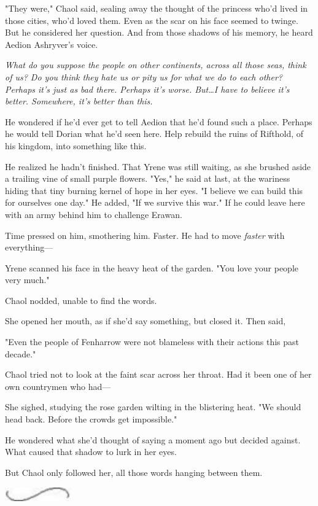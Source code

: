 "They were," Chaol said, sealing away the thought of the princess who'd lived in those cities, who'd loved them.
Even as the scar on his face seemed to twinge.
But he considered her question.
And from those shadows of his memory, he heard Aedion Ashryver's voice.

\emph{What do you suppose the people on other continents, across all those seas, think of us?
Do you think they hate us or pity us for what we do to each other?
Perhaps it's just as bad there.
Perhaps it's worse.
But\ldots I have to believe it's better.
Somewhere, it's better than this.}

He wondered if he'd ever get to tell Aedion that he'd found such a place.
Perhaps he would tell Dorian what he'd seen here.
Help rebuild the ruins of Rifthold, of his kingdom, into something like this.

He realized he hadn't finished.
That Yrene was still waiting, as she brushed aside a trailing vine of small purple flowers.
"Yes," he said at last, at the wariness hiding that tiny burning kernel of hope in her eyes.
"I believe we can build this for ourselves one day."
He added, "If we survive this war."
If he could leave here with an army behind him to challenge Erawan.

Time pressed on him, smothering him.
Faster.
He had to move \emph{faster} with everything---

Yrene scanned his face in the heavy heat of the garden.
"You love your people very much."

Chaol nodded, unable to find the words.

She opened her mouth, as if she'd say something, but closed it.
Then said,

"Even the people of Fenharrow were not blameless with their actions this past decade."

Chaol tried not to look at the faint scar across her throat.
Had it been one of her own countrymen who had---

She sighed, studying the rose garden wilting in the blistering heat.
"We should head back.
Before the crowds get impossible."

He wondered what she'd thought of saying a moment ago but decided against.
What caused that shadow to lurk in her eyes.

But Chaol only followed her, all those words hanging between them.

\begin{center}
	\includegraphics[width=1.12in,height=0.24in]{images/seperator}
\end{center}

